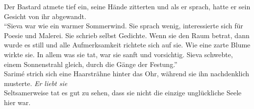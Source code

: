 Der Bastard atmete tief ein, seine Hände zitterten und als er sprach, hatte er sein Gesicht von ihr 
abgewandt.\\
``Sieva war wie ein warmer Sommerwind. Sie sprach wenig, interessierte sich für Poesie und Malerei. 
Sie schrieb selbst Gedichte. Wenn sie den Raum betrat, dann wurde es still und alle Aufmerksamkeit 
richtete sich auf sie. Wie eine zarte Blume wirkte sie. In allem was sie tat, war sie sanft und 
vorsichtig. Sieva schwebte, einem Sonnenstrahl gleich, durch die Gänge der Festung.''\\
Sarimé strich sich eine Haarsträhne hinter das Ohr, während sie ihn nachdenklich musterte. 
\textit{Er liebt sie}\\
Seltsamerweise tat es gut zu sehen, dass sie nicht die einzige unglückliche Seele hier war.\\



